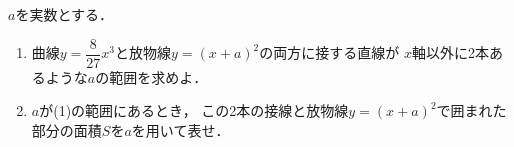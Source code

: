 \documentclass[../../main.tex]{subfiles}
\begin{document}
$a$を実数とする．
\begin{enumerate}
  \item 曲線$\displaystyle y=\dfrac{8}{27}x^3$と放物線$y={(x+a)}^2$の両方に接する直線が
    $x$軸以外に2本あるような$a$の範囲を求めよ．
  \item $a$が(1)の範囲にあるとき，
    この2本の接線と放物線$y={(x+a)}^2$で囲まれた部分の面積$S$を$a$を用いて表せ．
\end{enumerate}
\end{document}
